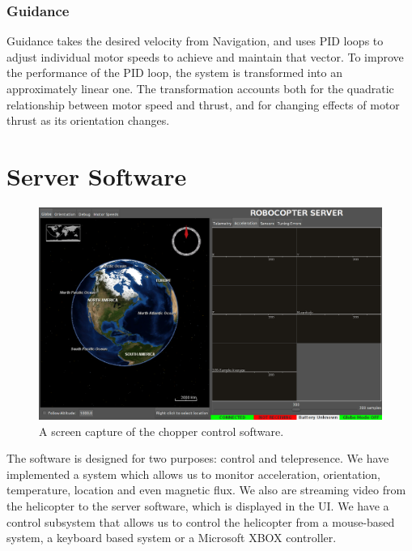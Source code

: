 \documentclass[letterpaper]{article}
\begin{document}
\subsubsection{Guidance}
Guidance takes the desired velocity from Navigation,‭ ‬and uses PID
loops to adjust individual motor speeds to achieve and maintain that
vector.‭  ‬To improve the performance of the PID loop,‭ ‬the system is
transformed into an approximately linear one.‭  ‬The transformation
accounts both for the quadratic relationship between motor speed and
thrust,‭ ‬and for changing effects of motor thrust as its orientation
changes.

\section{Server Software}
\begin{figure}[h]
  \centering
  \includegraphics[scale=0.3]{figures/globe-screenshot}
  \caption{A screen capture of the chopper control software.}
  \label{fig:globe}
\end{figure}

The software is designed for two purposes: control and
telepresence. We have implemented a system which allows us to monitor
acceleration, orientation, temperature, location and even magnetic
flux. We also are streaming video from the helicopter to the server
software, which is displayed in the UI. We have a control subsystem
that allows us to control the helicopter from a mouse-based system, a
keyboard based system or a Microsoft XBOX controller. 
\end{document}
